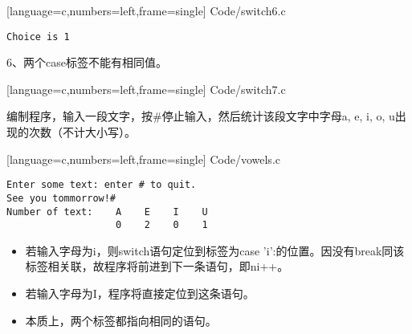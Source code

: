 \begin{frame}\ft{\secname}

[language=c,numbers=left,frame=single]
{Code/switch6.c}
\begin{lstlisting}[backgroundcolor=\color{blue!20}]
Choice is 1
\end{lstlisting}
\end{frame}

\begin{frame}\ft{\secname}
6、两个case标签不能有相同值。
\end{frame}

\begin{frame}\ft{\secname}

[language=c,numbers=left,frame=single]
{Code/switch7.c}
\end{frame}



\begin{frame}[fragile]\ft{\secname}
  \begin{li}
    编制程序，输入一段文字，按{\tf \#}停止输入，然后统计该段文字中字母a, e, i, o, u出现的次数（不计大小写）。
  \end{li}
\end{frame}



\begin{frame}\ft{\secname}

[language=c,numbers=left,frame=single]
{Code/vowels.c}
\end{frame}

\begin{frame}[fragile]\ft{\secname}
\begin{lstlisting}[backgroundcolor=\color{red!10}]
Enter some text: enter # to quit.
See you tommorrow!#
Number of text:    A    E    I    U
                   0    2    0    1
\end{lstlisting}   
\end{frame}

\begin{frame}[fragile]\ft{\secname}
\begin{itemize}
\item
若输入字母为i，则switch语句定位到标签为case 'i':的位置。因没有break同该标签相关联，故程序将前进到下一条语句，即ni++。\\[0.1in]
\item 
若输入字母为I，程序将直接定位到这条语句。\\[0.1in]
\item 
本质上，两个标签都指向相同的语句。
\end{itemize} 
\end{frame}

